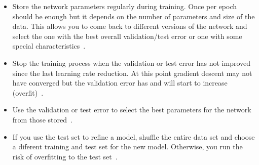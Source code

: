 \begin{itemize}
	\item Store the network parameters regularly during training. Once per epoch should be enough but it depends on the number of parameters and size of the data. This allows you to come back to different versions of the network and select the one with the best overall validation/test error or one with some special characteristics~\cite{Bengio2014}.

	\item Stop the training process when the validation or test error has not improved since the last learning rate reduction. At this point gradient descent may not have converged but the validation error has and will start to increase (overfit)~\cite{Bengio2012}.

	\item Use the validation or test error to select the best parameters for the network from those stored~\cite{Bengio2014}. 

	\item If you use the test set to refine a model, shuffle the entire data set and choose a diferent training and test set for the new model. Otherwise, you run the risk of overfitting to the test set~\cite{Ng2014}.
\end{itemize}



